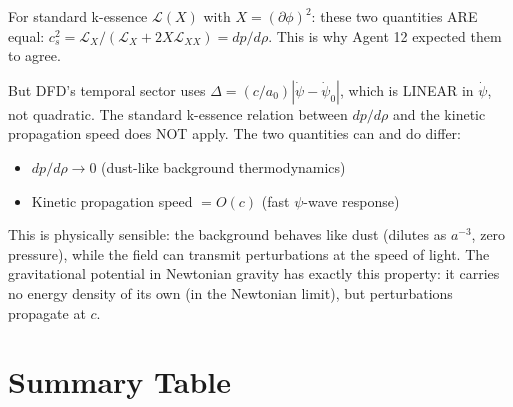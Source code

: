 \documentclass[11pt]{article}
\begin{document}
For standard k-essence $\mathcal{L}(X)$ with $X = (\partial\phi)^2$:
these two quantities ARE equal: $c_s^2 = \mathcal{L}_X / (\mathcal{L}_X
+ 2X\mathcal{L}_{XX}) = dp/d\rho$. This is why Agent 12 expected them
to agree.

But DFD's temporal sector uses $\Delta = (c/a_0)|\dot\psi - \dot\psi_0|$,
which is LINEAR in $\dot\psi$, not quadratic. The standard k-essence
relation between $dp/d\rho$ and the kinetic propagation speed does NOT
apply. The two quantities can and do differ:
\begin{itemize}[nosep]
\item $dp/d\rho \to 0$ (dust-like background thermodynamics)
\item Kinetic propagation speed $= O(c)$ (fast $\psi$-wave response)
\end{itemize}

This is physically sensible: the background behaves like dust (dilutes as
$a^{-3}$, zero pressure), while the field can transmit perturbations at
the speed of light. The gravitational potential in Newtonian gravity
has exactly this property: it carries no energy density of its own (in
the Newtonian limit), but perturbations propagate at $c$.


\section*{Summary Table}
\end{document}
